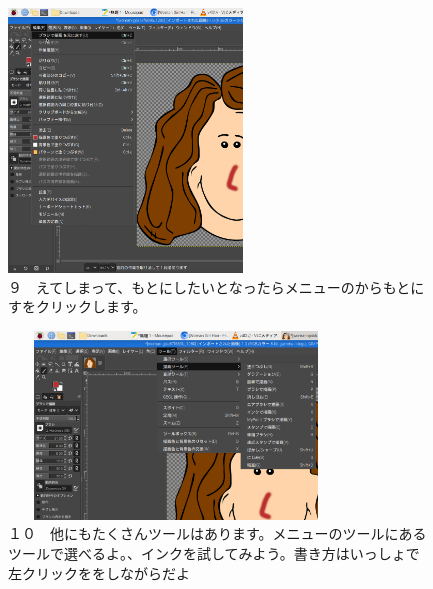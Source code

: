 \documentclass[a4paper,12pt]{jarticle}
\begin{document}
\begin{figure}[ht]
  \begin{minipage}{\textwidth}
    \begin{minipage}{6.984cm}
      \includegraphics[width=6.228cm]{textbook-img132.png}\\
      ９　えてしまって、もとにしたいとなったらメニューのからもとにすをクリックします。
    \end{minipage}
    \hfill
    \begin{minipage}{8.966cm}
      \includegraphics[width=8.881cm,height=4.997cm]{textbook-img133.png}\\
      １０　他にもたくさんツールはあります。メニューのツールにあるツールで選べるよ。、インクを試してみよう。書き方はいっしょで左クリックををしながらだよ
    \end{minipage}
  \end{minipage}
\end{figure}
\end{document}
